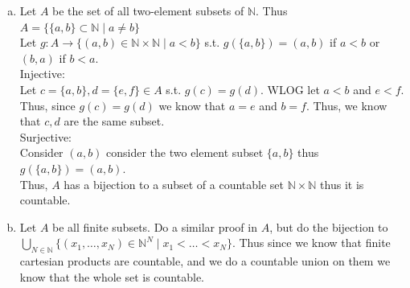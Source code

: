 \documentclass[12pt, letterpaper]{article}
\theoremstyle{definition}
\newcommand{\N}{\mathbb{N}}
\begin{document}
\begin{enumerate}[(a)]
    Injective:\\
    Let $f,h \in A$ s.t. $g(f)=g(h)$ thus we know that both $f,h$ both become constant at the same spot lets call it $N$ and that $f(1)=h(1),\dots,f(N)=h(N)$ thus these are the same functions since everything after and at $N$ is the same.
    Thus, $f=h$ thus injecive.
    Surjective:\\
    Let $s=(x_1,x_2,\dots,x_N)$. WLOG $s$ is length $N$. Thus pick the function in $A$ s.t. $f(i)=x_i$ for $i \in \{1,\dots,N\}$, and $f$ is constant at and after $N$. Thus, $g(f)=s$\\
    Thus $g$ is bijective. Thus, since finite cartesian products are countable we are doing countable unions on countable sets thus the whole set is countable.
    \item Let $A$ be the set of all two-element subsets of $\N$. Thus $A=\{\{a,b\} \subset \N \mid a \neq b\}$\\
    Let $g: A \rightarrow \{(a,b) \in \N \times \N \mid a < b\}$ s.t. $g(\{a,b\})=(a,b)$ if $a<b$ or $(b,a)$ if $b<a$.\\
    Injective:\\
    Let $c=\{a,b\},d=\{e,f\}\in A$ s.t. $g(c)=g(d)$. WLOG let $a<b$ and $e<f$. Thus, since $g(c)=g(d)$ we know that $a=e$ and $b=f$. Thus, we know that $c,d$ are the same subset.\\
    Surjective:\\
    Consider $(a,b)$ consider the two element subset $\{a,b\}$ thus $g(\{a,b\})=(a,b)$.\\
    Thus, $A$ has a bijection to a subset of a countable set $\N \times \N$ thus it is countable.\
    \item Let $A$ be all finite subsets. Do a similar proof in $A$, but do the bijection to $\bigcup_{N \in \N}\{(x_1,\dots,x_N) \in \N^N \mid x_1 < \dots < x_N\}$. Thus since we know that finite cartesian products are countable, and we do a countable union on them we know that the whole set is countable.
\end{enumerate}

\newpage
\end{document}
